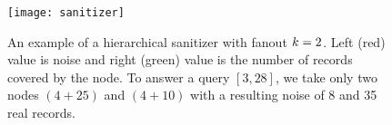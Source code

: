 \begin{figure}[h]
	\centering
	\texttt{[image: sanitizer]}
	\caption[An example of a hierarchical sanitizer]{
		An example of a hierarchical sanitizer \cite{hierarchical-methods-for-dp} with fanout $k = 2$.
		Left (red) value is noise and right (green) value is the number of records covered by the node.
		To answer a query $[3, 28]$, we take only two nodes $(4 + 25)$ and $(4 + 10)$ with a resulting noise of 8 and 35 real records.
	}\label{figure:sanitizer}
\end{figure}
